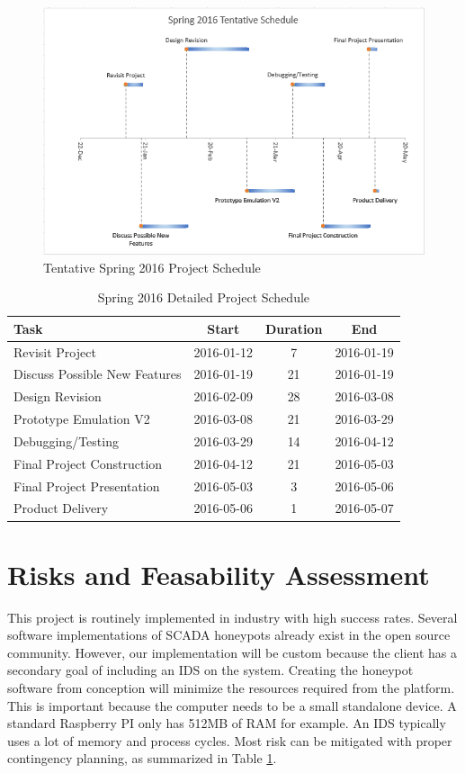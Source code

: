 \begin{figure}
\centering
\includegraphics[scale=0.65]{./figures/spring-timeline}
\caption{Tentative Spring 2016 Project Schedule}
\label{figure:fall-timeline}
\end{figure}

\begin{table}
\centering
\begin{tabular}{l  c  c  c}
Task & Start & Duration & End \\
\hline
Revisit Project	& 2016-01-12 & 7 & 2016-01-19 \\
Discuss Possible New Features & 2016-01-19 & 21 & 2016-01-19 \\
Design Revision & 2016-02-09 & 28 & 2016-03-08 \\
Prototype Emulation V2 & 2016-03-08 & 21 & 2016-03-29 \\
Debugging/Testing & 2016-03-29 & 14 & 2016-04-12 \\
Final Project Construction & 2016-04-12 & 21 & 2016-05-03 \\
Final Project Presentation & 2016-05-03 & 3 & 2016-05-06 \\
Product Delivery & 2016-05-06 & 1 & 2016-05-07 \\
\end{tabular}
\caption{Spring 2016 Detailed Project Schedule}
\label{table:risk}
\end{table}
\vspace{0.3cm}


\section{Risks and Feasability Assessment}

This project is routinely implemented in industry with high success rates. Several software implementations of SCADA honeypots already exist in the open source community. However, our implementation will be custom because the client has a secondary goal of including an IDS on the system. Creating the honeypot software from conception will minimize the resources required from the platform. This is important because the computer needs to be a small standalone device. A standard Raspberry PI only has 512MB of RAM for example. An IDS typically uses a lot of memory and process cycles. Most risk can be mitigated with proper contingency planning, as summarized in Table \ref{table:risk}.


